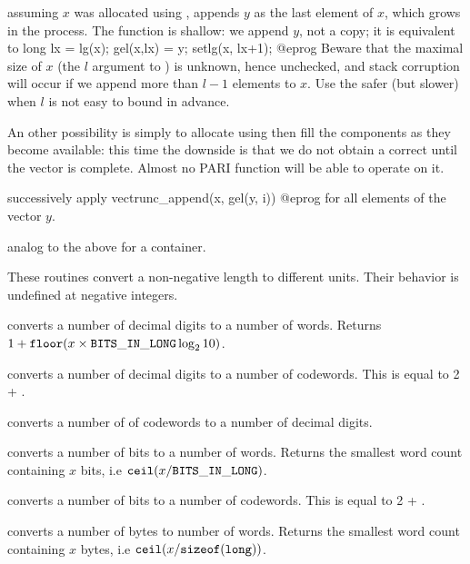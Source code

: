  assuming $x$ was allocated using
, appends $y$ as the last element of $x$, which
grows in the process. The function is shallow: we append $y$, not a copy;
it is equivalent to
\bprog
  long lx = lg(x); gel(x,lx) = y; setlg(x, lx+1);
@eprog\noindent
Beware that the maximal size of $x$ (the $l$ argument to )
is unknown, hence unchecked, and stack corruption will occur if we append
more than $l-1$ elements to $x$. Use the safer (but slower)
 when $l$ is not easy to bound in advance.

An other possibility is simply to allocate using  then fill
the components as they become available: this time the downside is that we do
not obtain a correct  until the vector is complete. Almost no PARI
function will be able to operate on it.

 successively apply
\bprog
  vectrunc_append(x, gel(y, i))
@eprog
for all elements of the vector $y$.


 analog to the above for a
 container.


These routines convert a non-negative length to different units. Their
behavior is undefined at negative integers.

 converts a number of decimal digits to a number
of words. Returns $ 1 + {\tt floor}(x \times {\tt BITS\_IN\_LONG} \log_2 10)$.

 converts a number of decimal digits to a number
of codewords. This is equal to 2 + .

 converts a number of of codewords to a
number of decimal digits.

 converts a number of bits to a number of
words. Returns the smallest word count containing $x$ bits, i.e $
{\tt ceil}(x / {\tt BITS\_IN\_LONG})$.

 converts a number of bits to a number of
codewords. This is equal to 2 + .

 converts a number of bytes to number of
words. Returns the smallest word count containing $x$ bytes, i.e
${\tt ceil}(x / {\tt sizeof(long)})$.

